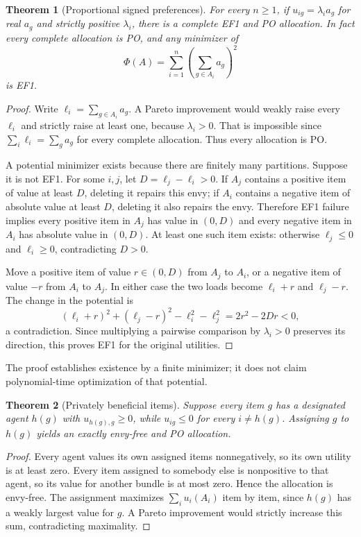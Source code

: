 \documentclass[11pt,a4paper]{article}
\newtheorem{theorem}{Theorem}[section]
\theoremstyle{remark}\newtheorem{remark}[theorem]{Remark}
\begin{document}
\begin{theorem}[Proportional signed preferences]\label{thm:proportional}
For every $n\ge1$, if $u_{ig}=\lambda_i a_g$ for real $a_g$ and strictly positive $\lambda_i$, there is a complete EF1 and PO allocation. In fact every complete allocation is PO, and any minimizer of
\[
\Phi(A)=\sum_{i=1}^n\left(\sum_{g\in A_i}a_g\right)^2
\]
is EF1.
\end{theorem}
\begin{proof}
Write $\ell_i=\sum_{g\in A_i}a_g$. A Pareto improvement would weakly raise every $\ell_i$ and strictly raise at least one, because $\lambda_i>0$. That is impossible since $\sum_i\ell_i=\sum_ga_g$ for every complete allocation. Thus every allocation is PO.

A potential minimizer exists because there are finitely many partitions. Suppose it is not EF1. For some $i,j$, let $D=\ell_j-\ell_i>0$. If $A_j$ contains a positive item of value at least $D$, deleting it repairs this envy; if $A_i$ contains a negative item of absolute value at least $D$, deleting it also repairs the envy. Therefore EF1 failure implies every positive item in $A_j$ has value in $(0,D)$ and every negative item in $A_i$ has absolute value in $(0,D)$. At least one such item exists: otherwise $\ell_j\le0$ and $\ell_i\ge0$, contradicting $D>0$.

Move a positive item of value $r\in(0,D)$ from $A_j$ to $A_i$, or a negative item of value $-r$ from $A_i$ to $A_j$. In either case the two loads become $\ell_i+r$ and $\ell_j-r$. The change in the potential is
\[
(\ell_i+r)^2+(\ell_j-r)^2-\ell_i^2-\ell_j^2=2r^2-2Dr<0,
\]
a contradiction. Since multiplying a pairwise comparison by $\lambda_i>0$ preserves its direction, this proves EF1 for the original utilities.
\end{proof}
The proof establishes existence by a finite minimizer; it does not claim polynomial-time optimization of that potential.

\begin{theorem}[Privately beneficial items]\label{thm:private}
Suppose every item $g$ has a designated agent $h(g)$ with $u_{h(g),g}\ge0$, while $u_{ig}\le0$ for every $i\ne h(g)$. Assigning $g$ to $h(g)$ yields an exactly envy-free and PO allocation.
\end{theorem}
\begin{proof}
Every agent values its own assigned items nonnegatively, so its own utility is at least zero. Every item assigned to somebody else is nonpositive to that agent, so its value for another bundle is at most zero. Hence the allocation is envy-free. The assignment maximizes $\sum_i u_i(A_i)$ item by item, since $h(g)$ has a weakly largest value for $g$. A Pareto improvement would strictly increase this sum, contradicting maximality.
\end{proof}
\end{document}

